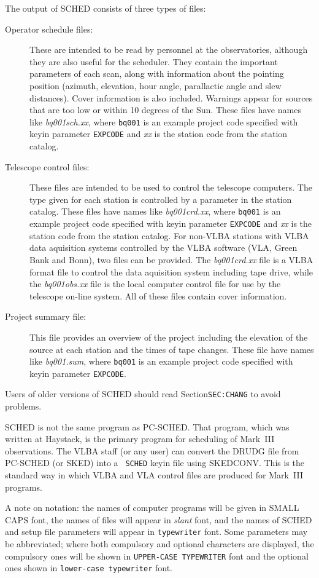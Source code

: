 The output of {\sc SCHED} consists of three types of files:
\begin{description}
\item [Operator schedule files:] These are intended to be read by 
personnel at the observatories, although they are also useful for the
scheduler. They contain the important parameters of each scan, along
with information about the pointing position (azimuth, elevation, hour
angle, parallactic angle and slew distances). Cover information is
also included. Warnings appear for sources that are too low or within
10 degrees of the Sun. These files have names like {\sl bq001sch.xx},
where {\tt bq001} is an example project code specified with keyin
parameter {\tt EXPCODE} and {\sl xx} is the station code from the
station catalog.

\item [Telescope control files:] These files are intended to be
used to control the telescope computers. The type given for each
station is controlled by a parameter in the station catalog. These
files have names like {\sl bq001crd.xx}, where {\tt bq001} is an
example project code specified with keyin parameter {\tt EXPCODE} and
{\sl xx} is the station code from the station catalog. For non-VLBA
stations with VLBA data aquisition systems controlled by the VLBA
software (VLA, Green Bank and Bonn), two files can be provided. The
{\sl bq001crd.xx} file is a VLBA format file to control the data
aquisition system including tape drive, while the {\sl bq001obs.xx}
file is the local computer control file for use by the telescope
on-line system. All of these files contain cover information.

\item [Project summary file:] This file provides an overview of the 
project including the elevation of the source at each station and the
times of tape changes. These file have names like {\sl bq001.sum},
where {\tt bq001} is an example project code specified with keyin
parameter {\tt EXPCODE}.
\end{description}

Users of older versions of {\sc SCHED} should read
Section{\tt SEC:CHANG} to avoid problems.

{\sc SCHED} is not the same program as {\sc PC-SCHED}. That program,
which was written at Haystack, is the primary program for scheduling
of Mark~III observations. The VLBA staff (or any user) can convert the
{\sc DRUDG} file from {\sc PC-SCHED} (or {\sc SKED}) into a {\tt
SCHED} keyin file using {\sc SKEDCONV}. This is the standard way in
which VLBA and VLA control files are produced for Mark~III programs.

A note on notation: the names of computer programs will be given in
{\sc SMALL CAPS} font, the names of files will appear in {\sl slant}
font, and the names of {\sc SCHED} and setup file parameters will
appear in {\tt typewriter} font. Some parameters may be abbreviated;
where both compulsory and optional characters are displayed, the
compulsory ones will be shown in {\tt UPPER-CASE TYPEWRITER} font and
the optional ones shown in {\tt lower-case typewriter} font.



